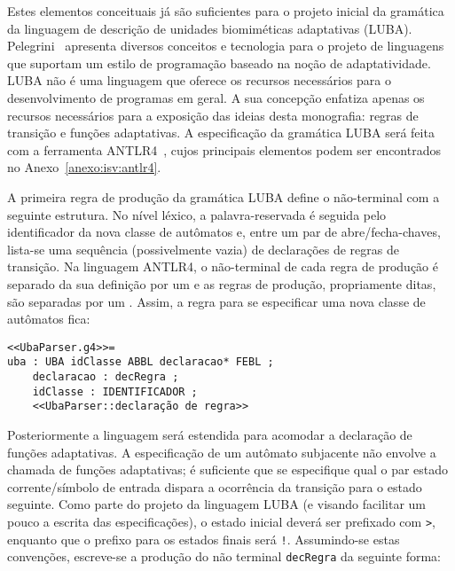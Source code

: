 
Estes elementos conceituais já são suficientes para o projeto inicial da gramática da linguagem de descrição de unidades biomiméticas adaptativas (LUBA). Pelegrini~\cite{pelegrini:2009} apresenta diversos conceitos e tecnologia para o projeto de linguagens que suportam um estilo de programação baseado na noção de adaptatividade. LUBA não é uma linguagem que oferece os recursos necessários para o desenvolvimento de programas em geral. A sua concepção enfatiza apenas os recursos necessários para a exposição das ideias desta monografia: regras de transição e funções adaptativas. A especificação da gramática LUBA será feita com a ferramenta ANTLR4~\cite{parr:2013}, cujos principais elementos podem ser encontrados no Anexo~\ref{anexo:isv:antlr4}.

A primeira regra de produção da gramática LUBA define o não-terminal  com a seguinte estrutura. No nível léxico, a palavra-reservada  é seguida pelo identificador da nova classe de autômatos e, entre um par de abre/fecha-chaves, lista-se uma sequência (possivelmente vazia) de declarações de regras de transição. Na linguagem ANTLR4, o não-terminal de cada regra de produção é separado da sua definição por um \terminal{:} e as regras de produção, propriamente ditas, são separadas por um \terminal{;}. Assim, a regra para se especificar uma nova classe de autômatos  fica:

\begin{lstlisting}[style=antlr]
<<UbaParser.g4>>=
uba : UBA idClasse ABBL declaracao* FEBL ;
	declaracao : decRegra ;
	idClasse : IDENTIFICADOR ;
    <<UbaParser::declaração de regra>>
\end{lstlisting}

Posteriormente a linguagem será estendida para acomodar a declaração de funções adaptativas. A especificação de um autômato subjacente não envolve a chamada de funções adaptativas; é suficiente que se especifique qual o par estado corrente/símbolo de entrada dispara a ocorrência da transição para o estado seguinte. Como parte do projeto da linguagem LUBA (e visando facilitar um pouco a escrita das especificações), o estado inicial deverá ser prefixado com \lstinline[style=antlr]'>', enquanto que o prefixo para os estados finais será \lstinline[style=antlr]'!'. Assumindo-se estas convenções, escreve-se a produção do não terminal \lstinline[style=antlr]!decRegra! da seguinte forma:

